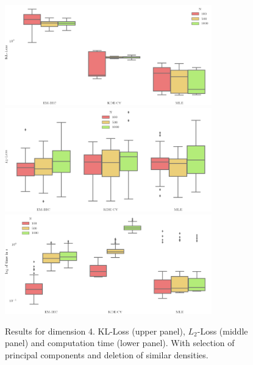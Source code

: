 \begin{figure}
\center
    \includegraphics[width=0.8\textwidth]{./TeX_files/dict_gen_loss_dim_4_KL_gof_pc_select.png}
    \includegraphics[width=0.8\textwidth]{./TeX_files/dict_gen_loss_dim_4_L2_gof_pc_select.png}
    \includegraphics[width=0.8\textwidth]{./TeX_files/dict_gen_time_dim_4_gof_pc_select.png}
    \caption{Results for dimension 4. KL-Loss (upper panel), $L_2$-Loss (middle panel) and computation time (lower panel). With selection of principal components and deletion of similar densities.}
    \label{fig:result_dict_gen_dim_4_gof_pc_select}
\end{figure}

